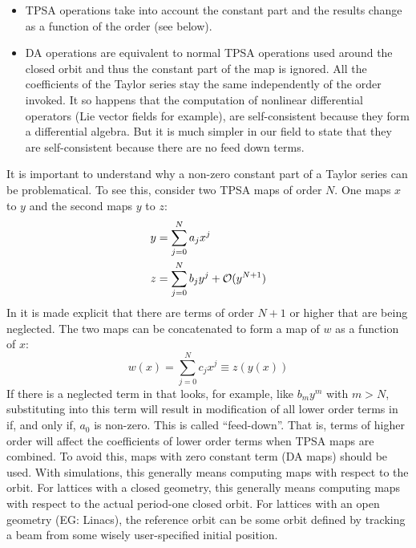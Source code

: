 \documentclass{hitec}     %
\begin{document}
{{{\begin{itemize}
\item TPSA operations take into account the constant part and the results change as a function of the order (see below). 
%
\item DA operations are equivalent to normal TPSA operations used around the closed orbit and thus the
constant part of the map is ignored. All the coefficients of the Taylor series stay the same
independently of the order invoked. It so happens that the computation of nonlinear differential
operators (Lie vector fields for example), are self-consistent because they form a differential
algebra. But it is much simpler in our field to state that they are self-consistent because there
are no feed down terms.
\end{itemize}

It is important to understand why a non-zero constant part of a Taylor series can be
problematical. To see this, consider two TPSA maps of order $N$. One maps $x$ to $y$ and the second
maps $y$ to $z$:
\begin{align}
  y &= \sum_{j = 0}^N a_j x^j  \label{yj0n} \\
  z &= \sum_{j = 0}^N b_j y^j + {\cal O}(y^{N+1}) \label{zj0n}
\end{align}
In  it is made explicit that there are terms of order $N+1$ or higher that are being neglected.
The two maps can be concatenated to form a map of {\color{h}$w$ as a function of $x$:
\begin{equation}
  w\left({x}\right) = \sum_{j = 0}^N c_j x^j
\equiv z\left({y\left({x}\right)}\right)
  \label{zj0nc}
\end{equation}
}
If there is a neglected term in  that looks, for example, like $b_m y^m$ with $m > N$, substituting
 into this term will result in modification of all lower order terms in  if, and
only if, $a_0$ is non-zero. This is
called ``feed-down''. That is, terms of higher order will affect the coefficients of lower order
terms when TPSA maps are combined. To avoid this, maps with zero constant term (DA maps) should be used. With
simulations, this generally means computing maps with respect to the   orbit. For
lattices with a closed geometry, this generally means computing maps with respect to the {\color{h} actual period-one closed} 
orbit. For lattices with an open geometry (EG: Linacs), the reference orbit can be some orbit
defined by tracking a beam from some {\color{h} wisely } user-specified initial position.

}}}
\end{document}
